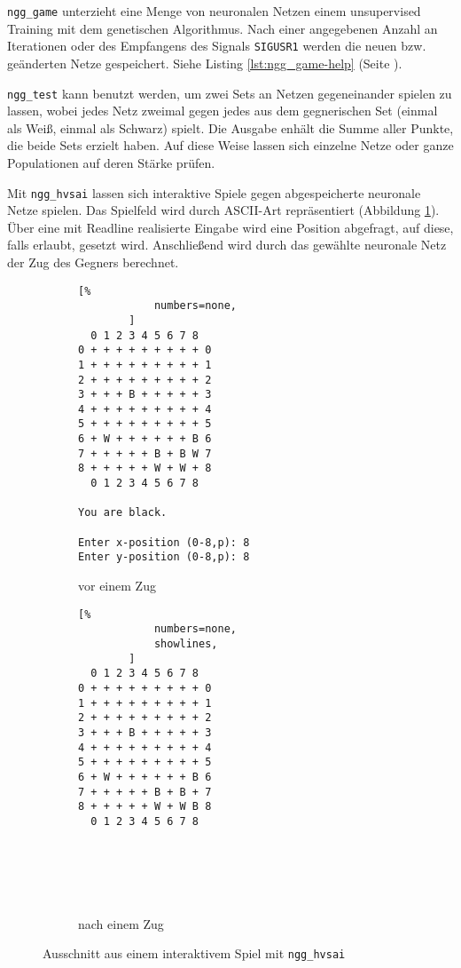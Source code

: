 \texttt{ngg\_game} unterzieht eine Menge von neuronalen Netzen einem
unsupervised Training mit dem genetischen Algorithmus. Nach einer angegebenen
Anzahl an Iterationen oder des Empfangens des Signals \texttt{SIGUSR1} werden
die neuen bzw. geänderten Netze gespeichert.
Siehe Listing \ref{lst:ngg_game-help} (Seite \pageref{lst:ngg_game-help}).

\texttt{ngg_test} kann benutzt werden, um zwei Sets an Netzen gegeneinander
spielen zu lassen, wobei jedes Netz zweimal gegen jedes aus dem gegnerischen
Set (einmal als Weiß, einmal als Schwarz) spielt. Die Ausgabe enhält die Summe
aller Punkte, die beide Sets erzielt haben. Auf diese Weise lassen sich einzelne
Netze oder ganze Populationen auf deren Stärke prüfen. 

Mit \texttt{ngg\_hvsai} lassen sich interaktive Spiele gegen abgespeicherte
neuronale Netze spielen. Das Spielfeld wird durch ASCII-Art repräsentiert
(Abbildung \ref{fig:ngg_hvsai}). Über eine mit Readline \cite{readline}
realisierte Eingabe wird eine Position abgefragt, auf diese, falls erlaubt,
gesetzt wird. Anschließend wird durch das gewählte neuronale Netz der Zug des
Gegners berechnet.

\begin{figure}
    \centering

    \begin{subfigure}[t]{0.45\textwidth}
        \begin{lstlisting}[%
            numbers=none,
        ]
  0 1 2 3 4 5 6 7 8 
0 + + + + + + + + + 0
1 + + + + + + + + + 1
2 + + + + + + + + + 2
3 + + + B + + + + + 3
4 + + + + + + + + + 4
5 + + + + + + + + + 5
6 + W + + + + + + B 6
7 + + + + + B + B W 7
8 + + + + + W + W + 8
  0 1 2 3 4 5 6 7 8 

You are black.

Enter x-position (0-8,p): 8
Enter y-position (0-8,p): 8
        \end{lstlisting}
        \caption{vor einem Zug}
    \end{subfigure}
    \quad
    \begin{subfigure}[t]{0.35\textwidth}
        \begin{lstlisting}[%
            numbers=none,
            showlines,
        ]
  0 1 2 3 4 5 6 7 8 
0 + + + + + + + + + 0
1 + + + + + + + + + 1
2 + + + + + + + + + 2
3 + + + B + + + + + 3
4 + + + + + + + + + 4
5 + + + + + + + + + 5
6 + W + + + + + + B 6
7 + + + + + B + B + 7
8 + + + + + W + W B 8
  0 1 2 3 4 5 6 7 8 




 
        \end{lstlisting}
        \caption{nach einem Zug}
    \end{subfigure}
    \caption{Ausschnitt aus einem interaktivem Spiel mit \texttt{ngg\_hvsai}}
    \label{fig:ngg_hvsai}
 \end{figure}

